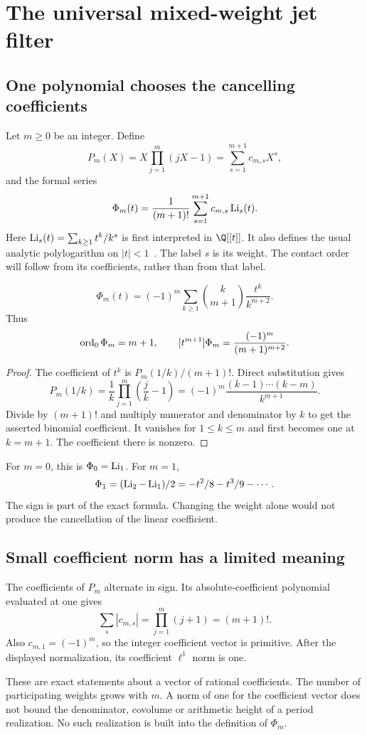\clearpage
\section{The universal mixed-weight jet filter}\label{sec:jet}
\subsection{One polynomial chooses the cancelling coefficients}
Let $m\ge0$ be an integer. Define
\[
 P_m(X)=X\prod_{j=1}^m(jX-1)=\sum_{s=1}^{m+1}c_{m,s}X^s,
\]
and the formal series
\[
 \Phi_m(t)=\frac1{(m+1)!}\sum_{s=1}^{m+1}c_{m,s}\operatorname{Li}_s(t).
\]
Here $\operatorname{Li}_s(t)=\sum_{k\ge1}t^k/k^s$ is first interpreted in $\Q[[t]]$. It also defines the usual analytic polylogarithm on $|t|<1$~\cite{DLMFPolylog}. The label $s$ is its weight. The contact order will follow from its coefficients, rather than from that label.

\begin{theorem}\label{thm:jet-contact}
\[
 \Phi_m(t)=(-1)^m\sum_{k\ge1}\binom{k}{m+1}\frac{t^k}{k^{m+2}}.
\]
Thus
\[
 \operatorname{ord}_0\Phi_m=m+1,\qquad
 [t^{m+1}]\Phi_m=\frac{(-1)^m}{(m+1)^{m+2}}.
\]
\end{theorem}
\begin{proof}
The coefficient of $t^k$ is $P_m(1/k)/(m+1)!$. Direct substitution gives
\[
 P_m(1/k)=\frac1k\prod_{j=1}^m\left(\frac jk-1\right)
 =(-1)^m\frac{(k-1)\cdots(k-m)}{k^{m+1}}.
\]
Divide by $(m+1)!$ and multiply numerator and denominator by $k$ to get the asserted binomial coefficient. It vanishes for $1\le k\le m$ and first becomes one at $k=m+1$. The coefficient there is nonzero.
\end{proof}
For $m=0$, this is $\Phi_0=\operatorname{Li}_1$. For $m=1$,
\[
 \Phi_1=(\operatorname{Li}_2-\operatorname{Li}_1)/2=-t^2/8-t^3/9-\cdots.
\]
The sign is part of the exact formula. Changing the weight alone would not produce the cancellation of the linear coefficient.

\subsection{Small coefficient norm has a limited meaning}
The coefficients of $P_m$ alternate in sign. Its absolute-coefficient polynomial evaluated at one gives
\[
 \sum_s|c_{m,s}|=\prod_{j=1}^m(j+1)=(m+1)!.
\]
Also $c_{m,1}=(-1)^m$, so the integer coefficient vector is primitive. After the displayed normalization, its coefficient $\ell^1$ norm is one.

These are exact statements about a vector of rational coefficients. The number of participating weights grows with $m$. A norm of one for the coefficient vector does not bound the denominator, covolume or arithmetic height of a period realization. No such realization is built into the definition of $\Phi_m$.

